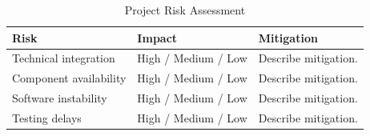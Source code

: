 \begin{table}[!htbp]
    \centering
    \small
    \begin{tabular}{p{4cm}p{3cm}p{6cm}}
        \toprule
        \textbf{Risk} & \textbf{Impact} & \textbf{Mitigation} \\
        \midrule
        Technical integration & High / Medium / Low & Describe mitigation. \\
        Component availability & High / Medium / Low & Describe mitigation. \\
        Software instability & High / Medium / Low & Describe mitigation. \\
        Testing delays & High / Medium / Low & Describe mitigation. \\
        \bottomrule
    \end{tabular}
    \caption{Project Risk Assessment}
\end{table}
